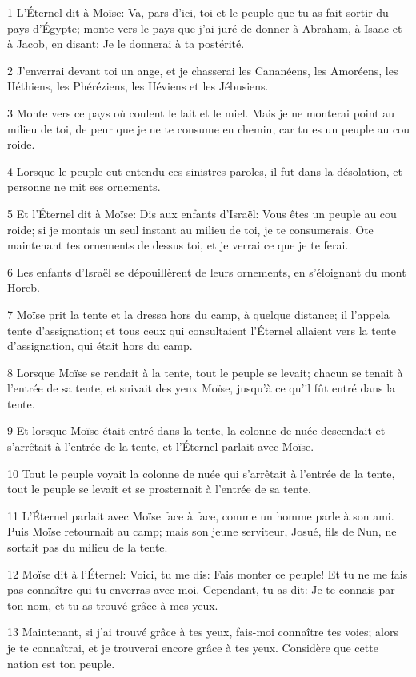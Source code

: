 \par 1 L'Éternel dit à Moïse: Va, pars d'ici, toi et le peuple que tu as fait sortir du pays d'Égypte; monte vers le pays que j'ai juré de donner à Abraham, à Isaac et à Jacob, en disant: Je le donnerai à ta postérité.
\par 2 J'enverrai devant toi un ange, et je chasserai les Cananéens, les Amoréens, les Héthiens, les Phéréziens, les Héviens et les Jébusiens.
\par 3 Monte vers ce pays où coulent le lait et le miel. Mais je ne monterai point au milieu de toi, de peur que je ne te consume en chemin, car tu es un peuple au cou roide.
\par 4 Lorsque le peuple eut entendu ces sinistres paroles, il fut dans la désolation, et personne ne mit ses ornements.
\par 5 Et l'Éternel dit à Moïse: Dis aux enfants d'Israël: Vous êtes un peuple au cou roide; si je montais un seul instant au milieu de toi, je te consumerais. Ote maintenant tes ornements de dessus toi, et je verrai ce que je te ferai.
\par 6 Les enfants d'Israël se dépouillèrent de leurs ornements, en s'éloignant du mont Horeb.
\par 7 Moïse prit la tente et la dressa hors du camp, à quelque distance; il l'appela tente d'assignation; et tous ceux qui consultaient l'Éternel allaient vers la tente d'assignation, qui était hors du camp.
\par 8 Lorsque Moïse se rendait à la tente, tout le peuple se levait; chacun se tenait à l'entrée de sa tente, et suivait des yeux Moïse, jusqu'à ce qu'il fût entré dans la tente.
\par 9 Et lorsque Moïse était entré dans la tente, la colonne de nuée descendait et s'arrêtait à l'entrée de la tente, et l'Éternel parlait avec Moïse.
\par 10 Tout le peuple voyait la colonne de nuée qui s'arrêtait à l'entrée de la tente, tout le peuple se levait et se prosternait à l'entrée de sa tente.
\par 11 L'Éternel parlait avec Moïse face à face, comme un homme parle à son ami. Puis Moïse retournait au camp; mais son jeune serviteur, Josué, fils de Nun, ne sortait pas du milieu de la tente.
\par 12 Moïse dit à l'Éternel: Voici, tu me dis: Fais monter ce peuple! Et tu ne me fais pas connaître qui tu enverras avec moi. Cependant, tu as dit: Je te connais par ton nom, et tu as trouvé grâce à mes yeux.
\par 13 Maintenant, si j'ai trouvé grâce à tes yeux, fais-moi connaître tes voies; alors je te connaîtrai, et je trouverai encore grâce à tes yeux. Considère que cette nation est ton peuple.
